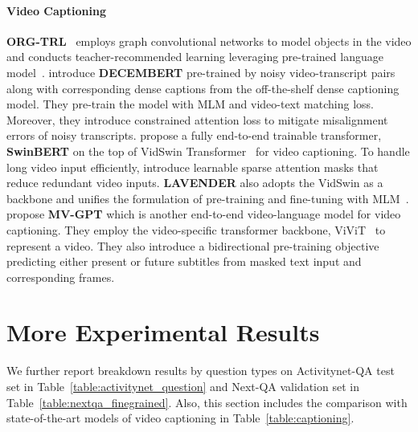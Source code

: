 \documentclass{article}
\begin{document}
\paragraph{Video Captioning}

\textbf{ORG-TRL}~\cite{zhang2020object} employs graph convolutional networks to model objects in the video and conducts teacher-recommended learning leveraging pre-trained language model~\cite{devlin2019bert}. \citet{tang2021decembert} introduce \textbf{DECEMBERT} pre-trained by noisy video-transcript pairs along with corresponding dense captions from the off-the-shelf dense captioning model. They pre-train the model with MLM and video-text matching loss. Moreover, they introduce constrained attention loss to mitigate misalignment errors of noisy transcripts.
\citet{lin2022swinbert} propose a fully end-to-end trainable transformer, \textbf{SwinBERT} on the top of VidSwin Transformer~\cite{liu2022video} for video captioning. To handle long video input efficiently, \citet{lin2022swinbert} introduce learnable sparse attention masks that reduce redundant video inputs. \textbf{LAVENDER} also adopts the VidSwin as a backbone and unifies the formulation of pre-training and fine-tuning with MLM~\cite{li2022lavender}. \citet{seo2022end} propose \textbf{MV-GPT} which is another end-to-end video-language model for video captioning. They employ the video-specific transformer backbone, ViViT~\cite{arnab2021vivit} to represent a video. They also introduce a bidirectional pre-training objective predicting either present or future subtitles from masked text input and corresponding frames.


\section{More Experimental Results}
\label{appendix:experiments}

We further report breakdown results by question types on Activitynet-QA test set in Table~\ref{table:activitynet_question} and Next-QA validation set in Table~\ref{table:nextqa_finegrained}. Also, this section includes the comparison with state-of-the-art models of video captioning in Table~\ref{table:captioning}.
\end{document}
